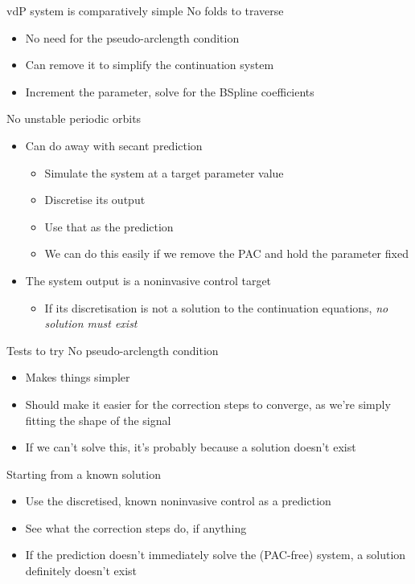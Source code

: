 \documentclass[presentation]{beamer}
\begin{document}
\begin{frame}[label={sec:org775a7b3}]{vdP system is comparatively simple}
No folds to traverse
\begin{itemize}
\item No need for the pseudo-arclength condition
\item Can remove it to simplify the continuation system
\item Increment the parameter, solve for the BSpline coefficients
\end{itemize}
\vfill
No unstable periodic orbits
\begin{itemize}
\item Can do away with secant prediction
\begin{itemize}
\item Simulate the system at a target parameter value
\item Discretise its output
\item Use that as the prediction
\item We can do this easily if we remove the PAC and hold the parameter fixed
\end{itemize}
\item The system output is a noninvasive control target
\begin{itemize}
\item If its discretisation is not a solution to the continuation equations, \emph{no solution must exist}
\end{itemize}
\end{itemize}
\end{frame}

\begin{frame}[label={sec:org5a57bd2}]{Tests to try}
No pseudo-arclength condition
\begin{itemize}
\item Makes things simpler
\item Should make it easier for the correction steps to converge, as we're simply fitting the shape of the signal
\item If we can't solve this, it's probably because a solution doesn't exist
\end{itemize}
\vfill
Starting from a known solution
\begin{itemize}
\item Use the discretised, known noninvasive control as a prediction
\item See what the correction steps do, if anything
\item If the prediction doesn't immediately solve the (PAC-free) system, a solution definitely doesn't exist
\end{itemize}
\end{frame}
\end{document}
